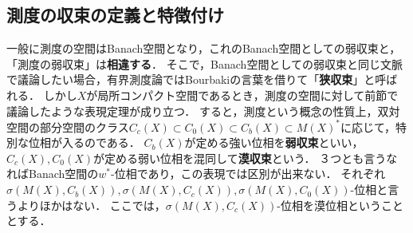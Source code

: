 \documentclass[uplatex,dvipdfmx]{jsreport}
\begin{document}
\subsection{測度の収束の定義と特徴付け}

\begin{tcolorbox}[colframe=ForestGreen, colback=ForestGreen!10!white,breakable,colbacktitle=ForestGreen!40!white,coltitle=black,fonttitle=\bfseries\sffamily,
title=測度の空間はBanach空間であるが，それ以上に具体的対象である．]
    一般に測度の空間はBanach空間となり，これのBanach空間としての弱収束と，「測度の弱収束」は\textbf{相違する}．
    そこで，Banach空間としての弱収束と同じ文脈で議論したい場合，有界測度論ではBourbakiの言葉を借りて「\textbf{狭収束}」と呼ばれる．
    しかし$X$が局所コンパクト空間であるとき，測度の空間に対して前節で議論したような表現定理が成り立つ．
    すると，測度という概念の性質上，双対空間の部分空間のクラス$C_c(X)\subset C_0(X)\subset C_b(X)\subset M(X)^*$に応じて，特別な位相が入るのである．
    $C_b(X)$が定める強い位相を\textbf{弱収束}といい，$C_c(X),C_0(X)$が定める弱い位相を混同して\textbf{漠収束}という．
    ３つとも言うなればBanach空間の$w^*$-位相であり，この表現では区別が出来ない．
    それぞれ$\sigma(M(X),C_b(X)),\sigma(M(X),C_c(X)),\sigma(M(X),C_0(X))$-位相と言うよりほかはない．
    ここでは，$\sigma(M(X),C_c(X))$-位相を漠位相ということとする．
\end{tcolorbox}
\end{document}
